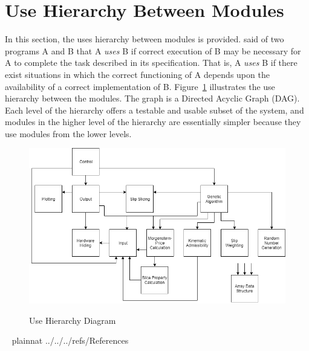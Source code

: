 \documentclass[12pt, titlepage]{article}
\begin{document}
\section{Use Hierarchy Between Modules} \label{SecUse}

\hspace{3ex}In this section, the uses hierarchy between modules is
provided. \cite{Parnas1978} said of two programs A and B that A {\em
  uses} B if correct execution of B may be necessary for A to complete
the task described in its specification. That is, A {\em uses} B if
there exist situations in which the correct functioning of A depends
upon the availability of a correct implementation of B. 
Figure~\ref{Fig_Use} illustrates the use hierarchy between the modules. The
graph is a Directed Acyclic Graph (DAG). Each level of the hierarchy
offers a testable and usable subset of the system, and modules in the
higher level of the hierarchy are essentially simpler because they use
modules from the lower levels.

\begin{figure}[h!]
\begin{center}
{
 \includegraphics[width=1.1\textwidth]{UseHierarchyDiagram.png}
}
\caption{Use Hierarchy Diagram}
\label{Fig_Use}
\end{center}
\end{figure}
~\newpage
 {plainnat}
 {../../../refs/References}
\end{document}
